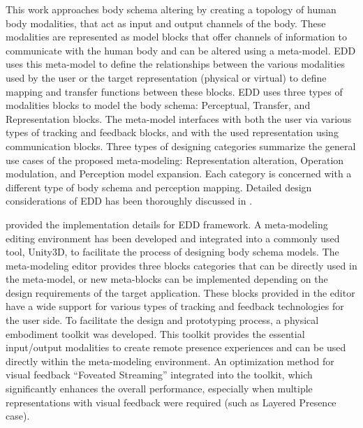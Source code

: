 This work approaches body schema altering by creating a topology of human body modalities, that act as input and output channels of the body. These modalities are represented as model blocks that offer channels of information to communicate with the human body and can be altered using a meta-model. EDD uses this meta-model to define the relationships between the various modalities used by the user or the target representation (physical or virtual) to define mapping and transfer functions between these blocks. EDD uses three types of modalities blocks to model the body schema: Perceptual, Transfer, and Representation blocks. The meta-model interfaces with both the user via various types of tracking and feedback blocks, and with the used representation using communication blocks. Three types of designing categories summarize the general use cases of the proposed meta-modeling: Representation alteration, Operation modulation, and Perception model expansion. Each category is concerned with a different type of body schema and perception mapping. Detailed design considerations of EDD has been thoroughly discussed in .

 provided the implementation details for EDD framework. A meta-modeling editing environment has been developed and integrated into a commonly used tool, Unity3D, to facilitate the process of designing body schema models. The meta-modeling editor provides three blocks categories that can be directly used in the meta-model, or new meta-blocks can be implemented depending on the design requirements of the target application. These blocks provided in the editor have a wide support for various types of tracking and feedback technologies for the user side. To facilitate the design and prototyping process, a physical embodiment toolkit was developed. This toolkit provides the essential input/output modalities to create remote presence experiences and can be used directly within the meta-modeling environment. An optimization method for visual feedback ``Foveated Streaming'' integrated into the toolkit, which significantly enhances the overall performance, especially when multiple representations with visual feedback were required (such as Layered Presence case).

